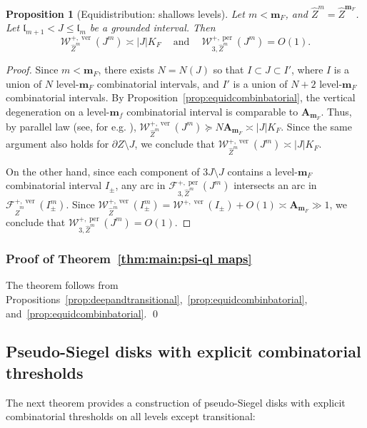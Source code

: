 \documentclass{amsart}
\renewcommand{\sp}{{\ \ }}
\newcommand{\1}{{\mathbb 1 }}
\newcommand{\Fam}{{\mathcal F}}
\newcommand{\Width}{{\mathcal W}}
\newcommand{\bA}{{\mathbf{A}}}
\newcommand{\wZ}{{\widehat Z}}
\newcommand{\bbm}{{\mathbf m}}
\newcommand{\length}{{\mathfrak l}}
\newcommand\ver{{\operatorname{ver}}}
\newcommand\per{{\operatorname{per}}}
\newtheorem{prop}[thm]{Proposition}
\theoremstyle{remark}
\numberwithin{equation}{section}
\theoremstyle{definition}
\begin{document}
\begin{prop}[Equidistribution: shallows levels]
\label{prop:equidcombinbatorial:shallow_levels}
    Let $m < \bbm_F$, and $\wZ^m = \wZ^{\bbm_F}$. Let $\length_{m+1} < J\leq \length_m$ be a grounded interval.
    Then
    \[\Width_{\wZ^m}^{+,\ver} (J^m)\asymp |J|K_F  \sp\sp\text{ and }\sp\sp \Width_{3,\wZ^m}^{+,\per} (J^m)=O(1).\]
\end{prop}
\begin{proof}
    Since $m < \bbm_F$, there exists $N = N(J)$ so that $I \subset J\subset I'$, where $I$ is a union of $N$ level-$\bbm_F$ combinatorial intervals, and $I'$ is a union of $N+2$ level-$\bbm_F$ combinatorial intervals.
    By Proposition~\ref{prop:equidcombinbatorial}, the vertical degeneration on a level-$\bbm_f$ combinatorial interval is comparable to $\bA_{\bbm_F}$. Thus, by parallel law (see, for e.g. \cite[A.1.4]{DL22}),  $\Width_{\wZ^m}^{+,\ver} (J^m) \succeq N \bA_{\bbm_F} \asymp |J|K_F$.
    Since the same argument also holds for $\partial Z \setminus J$, we conclude that $\Width_{\wZ^m}^{+,\ver} (J^m) \asymp |J|K_F$.

    On the other hand, since each component of $3 J \setminus J$ contains a level-$\bbm_F$ combinatorial interval $I_\pm$, any arc in $\Fam^{+, \per}_{3,\wZ^m}(J^m)$ intersects an arc in $\Fam^{+, \ver}_{\wZ^m}(I_\pm^m)$. Since $\Width^{+, \ver}_{\wZ^m}(I_\pm^m) = \Width^{+, \ver}(I_{\pm}) + O(1) \asymp \bA_{\bbm_F} \gg 1$, we conclude that $\Width^{+, \per}_{3,\wZ^m}(J^m) = O(1)$.
\end{proof}
\subsubsection{Proof of Theorem~\ref{thm:main:psi-ql maps}}
    The theorem follows from Propositions~\ref{prop:deepandtransitional},~\ref{prop:equidcombinbatorial}, and~\ref{prop:equidcombinbatorial}. \qed



\subsection{Pseudo-Siegel disks with explicit combinatorial thresholds} The next theorem provides a construction of pseudo-Siegel disks with explicit combinatorial thresholds on all levels except transitional:
\end{document}
